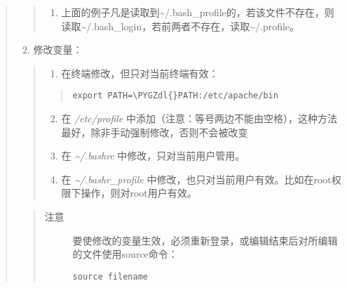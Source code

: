 \documentclass[letterpaper,10pt,english]{sphinxmanual}
\def\PYGZdl{\char`\$}
\begin{document}
\begin{quote}
\begin{quote}
\begin{enumerate}
\item {} 
上面的例子凡是读取到\textasciitilde{}/.bash\_profile的，若该文件不存在，则读取\textasciitilde{}/.bash\_login，若前两者不存在，读取\textasciitilde{}/.profile。

\end{enumerate}
\end{quote}
\begin{enumerate}
\setcounter{enumi}{1}
\item {} 
修改变量：

\end{enumerate}
\begin{quote}
\begin{enumerate}
\item {} 
在终端修改，但只对当前终端有效：

\end{enumerate}
\begin{quote}

\begin{Verbatim}[commandchars=\\\{\}]
export PATH=\PYGZdl{}PATH:/etc/apache/bin
\end{Verbatim}
\end{quote}
\begin{enumerate}
\setcounter{enumi}{1}
\item {} 
在 \emph{/etc/profile} 中添加（注意：等号两边不能由空格），这种方法最好，除非手动强制修改，否则不会被改变

\item {} 
在 \emph{\textasciitilde{}/.bashrc} 中修改，只对当前用户管用。

\item {} 
在 \emph{\textasciitilde{}/.bashr\_profile} 中修改，也只对当前用户有效。比如在root权限下操作，则对root用户有效。

\end{enumerate}
\end{quote}
\begin{quote}\begin{description}
\item[{注意}] \leavevmode
要使修改的变量生效，必须重新登录，或编辑结束后对所编辑的文件使用source命令：

\begin{Verbatim}[commandchars=\\\{\}]
source filename
\end{Verbatim}

\end{description}\end{quote}
\end{quote}
\end{document}
